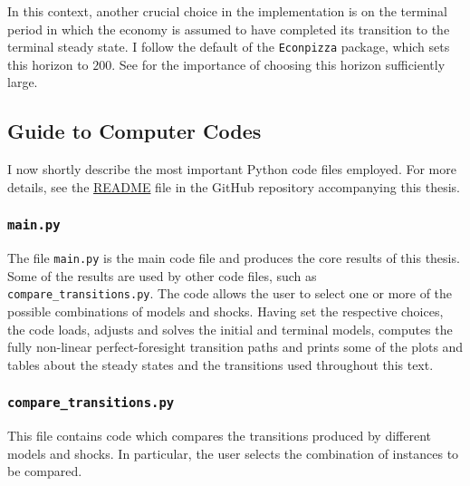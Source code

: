 \documentclass[a4paper,12pt]{article} %
\numberwithin{equation}{section} %
\numberwithin{figure}{section}
\numberwithin{table}{section}
\begin{document}
\begin{refsection}
\begin{appendices}
In this context, another crucial choice in the implementation is on the terminal period in which the economy is assumed to have completed its transition to the terminal steady state. I follow the default of the \texttt{Econpizza} package, which sets this horizon to $200$. See \textcite{auclert2021} for the importance of choosing this horizon sufficiently large.

\subsection{Guide to Computer Codes}
\label{sec-app:codes-guide}

I now shortly describe the most important Python code files employed. For more details, see the \href{https://github.com/andkound98/master-thesis/blob/main/README.md}{README} file in the GitHub repository accompanying this thesis. 

\subsubsection*{\texttt{main.py}}

The file \texttt{main.py} is the main code file and produces the core results of this thesis. Some of the results are used by other code files, such as \texttt{compare\_transitions.py}. The code
allows the user to select one or more of the possible combinations of models and shocks. Having set the respective choices, the code loads, adjusts and solves the initial and terminal models, computes the fully non-linear perfect-foresight transition paths and prints some of the plots and tables about the steady states and the transitions used throughout this text.

\subsubsection*{\texttt{compare\_transitions.py}}

This file contains code which compares the transitions produced by different models and shocks. In particular, the user selects the combination of instances to be compared.


\end{appendices}
\end{refsection}
\end{document}
